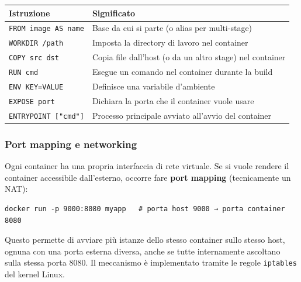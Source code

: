 \documentclass[
  italian,
  openany]{book}
\newcounter{none} %
\begin{document}
{\def\LTcaptype{none} %
\begin{longtable}[]{@{}
  >{\raggedright\arraybackslash}p{}
  >{\raggedright\arraybackslash}p{}@{}}
\toprule\noalign{}
\begin{minipage}[b]{\linewidth}\raggedright
Istruzione
\end{minipage} & \begin{minipage}[b]{\linewidth}\raggedright
Significato
\end{minipage} \\
\midrule\noalign{}
\endhead
\bottomrule\noalign{}
\endlastfoot
\texttt{FROM\ image\ AS\ name} & Base da cui si parte (o alias per
multi-stage) \\
\texttt{WORKDIR\ /path} & Imposta la directory di lavoro nel
container \\
\texttt{COPY\ src\ dst} & Copia file dall'host (o da un altro stage) nel
container \\
\texttt{RUN\ cmd} & Esegue un comando nel container durante la build \\
\texttt{ENV\ KEY=VALUE} & Definisce una variabile d'ambiente \\
\texttt{EXPOSE\ port} & Dichiara la porta che il container vuole
usare \\
\texttt{ENTRYPOINT\ {[}"cmd"{]}} & Processo principale avviato all'avvio
del container \\
\end{longtable}
}

\subsubsection{Port mapping e
networking}\label{port-mapping-e-networking}

Ogni container ha una propria interfaccia di rete virtuale. Se si vuole
rendere il container accessibile dall'esterno, occorre fare \textbf{port
mapping} (tecnicamente un NAT):

\begin{verbatim}
docker run -p 9000:8080 myapp   # porta host 9000 → porta container 8080
\end{verbatim}

Questo permette di avviare più istanze dello stesso container sullo
stesso host, ognuna con una porta esterna diversa, anche se tutte
internamente ascoltano sulla stessa porta 8080. Il meccanismo è
implementato tramite le regole \texttt{iptables} del kernel Linux.
\end{document}
